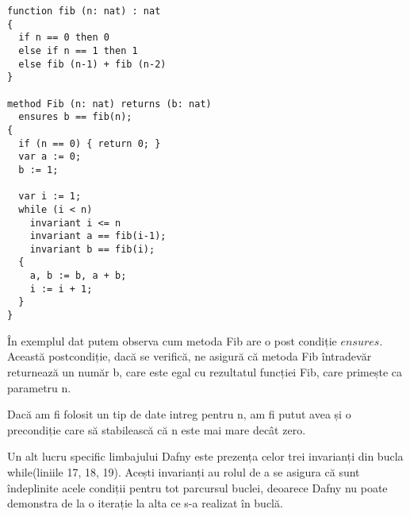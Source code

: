\begin{lstlisting}
function fib (n: nat) : nat
{
  if n == 0 then 0
  else if n == 1 then 1
  else fib (n-1) + fib (n-2)
}

method Fib (n: nat) returns (b: nat)
  ensures b == fib(n);
{
  if (n == 0) { return 0; }
  var a := 0;
  b := 1;
  
  var i := 1;
  while (i < n)
    invariant i <= n
    invariant a == fib(i-1);
    invariant b == fib(i);
  {
    a, b := b, a + b;
    i := i + 1;
  }
}
\end{lstlisting}

În exemplul dat putem observa cum metoda Fib are o post condiție $ensures$. Această postcondiție, dacă se verifică,
ne asigură că metoda Fib întradevăr returnează un număr b, care este egal cu rezultatul funcției Fib, care primește ca parametru n.\par
Dacă am fi folosit un tip de date intreg pentru n, am fi putut avea și o precondiție care să stabilească că n este mai mare decât zero.\par
Un alt lucru specific limbajului Dafny este prezența celor trei invarianți din bucla while(liniile 17, 18, 19).
Acești invarianți au rolul de a se asigura că sunt îndeplinite acele condiții pentru tot parcursul buclei, deoarece Dafny 
nu poate demonstra de la o iterație la alta ce s-a realizat în buclă.\par


